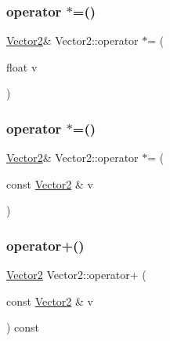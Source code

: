\mbox{\label{class_vector2_a190a2ec69deb7cc500711940e806faa1}} 
\subsubsection{\texorpdfstring{operator $\ast$=()}{operator *=()}\hspace{0.1cm}{\footnotesize\ttfamily [1/2]}}
{\footnotesize\ttfamily \mbox{\hyperlink{class_vector2}{Vector2}}\& Vector2\+::operator $\ast$= (\begin{DoxyParamCaption}\item[{float}]{v }\end{DoxyParamCaption})\hspace{0.3cm}{\ttfamily [inline]}}

\mbox{\label{class_vector2_ab78b94be5b2a97c84cc8d7febc9747cf}} 
\subsubsection{\texorpdfstring{operator $\ast$=()}{operator *=()}\hspace{0.1cm}{\footnotesize\ttfamily [2/2]}}
{\footnotesize\ttfamily \mbox{\hyperlink{class_vector2}{Vector2}}\& Vector2\+::operator $\ast$= (\begin{DoxyParamCaption}\item[{const \mbox{\hyperlink{class_vector2}{Vector2}} \&}]{v }\end{DoxyParamCaption})\hspace{0.3cm}{\ttfamily [inline]}}

\mbox{\label{class_vector2_a18759ffa878ab208dbe092ae07e70b6f}} 
\subsubsection{\texorpdfstring{operator+()}{operator+()}\hspace{0.1cm}{\footnotesize\ttfamily [1/2]}}
{\footnotesize\ttfamily \mbox{\hyperlink{class_vector2}{Vector2}} Vector2\+::operator+ (\begin{DoxyParamCaption}\item[{const \mbox{\hyperlink{class_vector2}{Vector2}} \&}]{v }\end{DoxyParamCaption}) const\hspace{0.3cm}{\ttfamily [inline]}}


